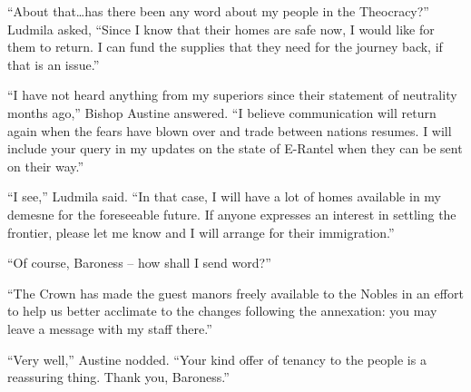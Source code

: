  

“About that…has there been any word about my people in the Theocracy?” Ludmila asked, “Since I know that their homes are safe now, I would like for them to return. I can fund the supplies that they need for the journey back, if that is an issue.”

 

“I have not heard anything from my superiors since their statement of neutrality months ago,” Bishop Austine answered. “I believe communication will return again when the fears have blown over and trade between nations resumes. I will include your query in my updates on the state of E-Rantel when they can be sent on their way.”

 

“I see,” Ludmila said. “In that case, I will have a lot of homes available in my demesne for the foreseeable future. If anyone expresses an interest in settling the frontier, please let me know and I will arrange for their immigration.”

 

“Of course, Baroness – how shall I send word?”

 

“The Crown has made the guest manors freely available to the Nobles in an effort to help us better acclimate to the changes following the annexation: you may leave a message with my staff there.”

 

“Very well,” Austine nodded. “Your kind offer of tenancy to the people is a reassuring thing. Thank you, Baroness.”